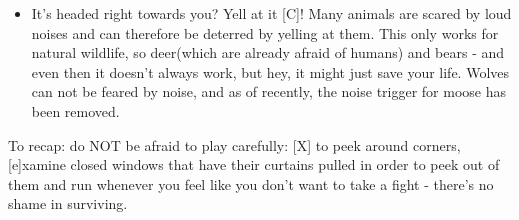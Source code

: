 \documentclass[11pt]{report}
\begin{document}
\begin{itemize}
\item It's headed right towards you? Yell at it [C]! Many animals are scared by loud noises and can therefore be deterred by yelling at them. This only works for natural wildlife, so deer(which are already afraid of humans) and bears - and even then it doesn't always work, but hey, it might just save your life. Wolves can not be feared by noise, and as of recently, the noise trigger for moose has been removed.
\end{itemize}

To recap: do NOT be afraid to play carefully: [X] to peek around corners, [e]xamine closed windows that have their curtains pulled in order to peek out of them and run whenever you feel like you don't want to take a fight - there's no shame in surviving.
\end{document}

